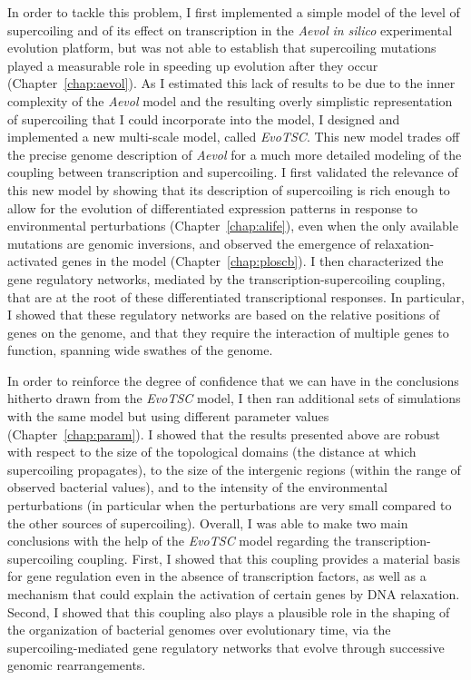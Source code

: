 In order to tackle this problem, I first implemented a simple model of the level of supercoiling and of its effect on transcription in the \emph{Aevol} \emph{in silico} experimental evolution platform, but was not able to establish that supercoiling mutations played a measurable role in speeding up evolution after they occur  (Chapter~\ref{chap:aevol}).
As I estimated this lack of results to be due to the inner complexity of the \emph{Aevol} model and the resulting overly simplistic representation of supercoiling that I could incorporate into the model, I designed and implemented a new multi-scale model, called \emph{EvoTSC}.
This new model trades off the precise genome description of \emph{Aevol} for a much more detailed modeling of the coupling between transcription and supercoiling.
I first validated the relevance of this new model by showing that its description of supercoiling is rich enough to allow for the evolution of differentiated expression patterns in response to environmental perturbations (Chapter~\ref{chap:alife}), even when the only available mutations are genomic inversions, and observed the emergence of relaxation-activated genes in the model (Chapter~\ref{chap:ploscb}).
I then characterized the gene regulatory networks, mediated by the transcription-supercoiling coupling, that are at the root of these differentiated transcriptional responses.
In particular, I showed that these regulatory networks are based on the relative positions of genes on the genome, and that they require the interaction of multiple genes to function, spanning wide swathes of the genome.

In order to reinforce the degree of confidence that we can have in the conclusions hitherto drawn from the \emph{EvoTSC} model, I then ran additional sets of simulations with the same model but using different parameter values (Chapter~\ref{chap:param}).
I showed that the results presented above are robust with respect to the size of the topological domains (the distance at which supercoiling propagates), to the size of the intergenic regions (within the range of observed bacterial values), and to the intensity of the environmental perturbations (in particular when the perturbations are very small compared to the other sources of supercoiling).
Overall, I was able to make two main conclusions with the help of the \emph{EvoTSC} model regarding the transcription-supercoiling coupling.
First, I showed that this coupling provides a material basis for gene regulation even in the absence of transcription factors, as well as a mechanism that could explain the activation of certain genes by DNA relaxation.
Second, I showed that this coupling also plays a plausible role in the shaping of the organization of bacterial genomes over evolutionary time, via the supercoiling-mediated gene regulatory networks that evolve through successive genomic rearrangements.

